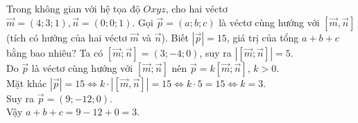\begin{ex}%
	Trong không gian với hệ tọa độ $O x y z$, cho hai véctơ $\overrightarrow{m}=(4; 3; 1), \overrightarrow{n}=(0; 0; 1)$. Gọi $\overrightarrow{p}=\left(a;b;c\right)$ là véctơ cùng hướng với $[\overrightarrow{m}, \overrightarrow{n}]$ (tích có hướng của hai véctơ $\overrightarrow{m}$ và $\overrightarrow{n}$). Biết $|\overrightarrow{p}|=15$, giá trị của tổng $a+b+c$ bằng bao nhiêu?
	\loigiai
	{
		Ta có  $[\overrightarrow{m}; \overrightarrow{n}]=(3;-4; 0)$, suy ra $|[\overrightarrow{m}; \overrightarrow{n}]|=5$.\\
		Do $\overrightarrow{p}$ là véctơ cùng hướng với $[\overrightarrow{m}; \overrightarrow{n}]$ nên $\overrightarrow{p}=k[\overrightarrow{m}; \overrightarrow{n}]$, $k>0$.\\
		Mặt khác $|\overrightarrow{p}|=15 \Leftrightarrow k \cdot|[\overrightarrow{m}, \overrightarrow{n}]| =15 \Leftrightarrow k\cdot 5=15 \Leftrightarrow k=3$.\\
		Suy ra $\overrightarrow{p}=(9;-12; 0)$.	\\
		Vậy $a+b+c=9-12+0=3$.
	}
\end{ex}
